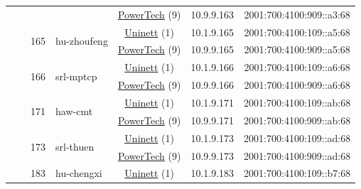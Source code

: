 \begin{small}
\begin{center}
\begin{longtable}{|c|c|c|c|c|c|c|c|}
  &  &  &  & \multicolumn{2}{|c|}{\tiny{\href{http://www.powertech.no}{PowerTech} (9)}} & \tiny{10.9.9.163} & \tiny{2001:700:4100:909::a3:68} \\* \cline{3-3}\cline{4-4}\cline{5-5}\cline{6-6}\cline{7-7}\cline{8-8}
  &  & \multirow{2}{*}{\tiny{165}} & \multicolumn{1}{|l|}{\multirow{2}{*}{\tiny{hu-zhoufeng}}} & \multicolumn{2}{|c|}{\tiny{\href{https://www.uninett.no}{Uninett} (1)}} & \tiny{10.1.9.165} & \tiny{2001:700:4100:109::a5:68} \\* \cline{5-5}\cline{6-6}\cline{7-7}\cline{8-8}
  &  &  &  & \multicolumn{2}{|c|}{\tiny{\href{http://www.powertech.no}{PowerTech} (9)}} & \tiny{10.9.9.165} & \tiny{2001:700:4100:909::a5:68} \\* \cline{3-3}\cline{4-4}\cline{5-5}\cline{6-6}\cline{7-7}\cline{8-8}
  &  & \multirow{2}{*}{\tiny{166}} & \multicolumn{1}{|l|}{\multirow{2}{*}{\tiny{srl-mptcp}}} & \multicolumn{2}{|c|}{\tiny{\href{https://www.uninett.no}{Uninett} (1)}} & \tiny{10.1.9.166} & \tiny{2001:700:4100:109::a6:68} \\* \cline{5-5}\cline{6-6}\cline{7-7}\cline{8-8}
  &  &  &  & \multicolumn{2}{|c|}{\tiny{\href{http://www.powertech.no}{PowerTech} (9)}} & \tiny{10.9.9.166} & \tiny{2001:700:4100:909::a6:68} \\* \cline{3-3}\cline{4-4}\cline{5-5}\cline{6-6}\cline{7-7}\cline{8-8}
  &  & \multirow{2}{*}{\tiny{171}} & \multicolumn{1}{|l|}{\multirow{2}{*}{\tiny{haw-cmt}}} & \multicolumn{2}{|c|}{\tiny{\href{https://www.uninett.no}{Uninett} (1)}} & \tiny{10.1.9.171} & \tiny{2001:700:4100:109::ab:68} \\* \cline{5-5}\cline{6-6}\cline{7-7}\cline{8-8}
  &  &  &  & \multicolumn{2}{|c|}{\tiny{\href{http://www.powertech.no}{PowerTech} (9)}} & \tiny{10.9.9.171} & \tiny{2001:700:4100:909::ab:68} \\* \cline{3-3}\cline{4-4}\cline{5-5}\cline{6-6}\cline{7-7}\cline{8-8}
  &  & \multirow{2}{*}{\tiny{173}} & \multicolumn{1}{|l|}{\multirow{2}{*}{\tiny{srl-thuen}}} & \multicolumn{2}{|c|}{\tiny{\href{https://www.uninett.no}{Uninett} (1)}} & \tiny{10.1.9.173} & \tiny{2001:700:4100:109::ad:68} \\* \cline{5-5}\cline{6-6}\cline{7-7}\cline{8-8}
  &  &  &  & \multicolumn{2}{|c|}{\tiny{\href{http://www.powertech.no}{PowerTech} (9)}} & \tiny{10.9.9.173} & \tiny{2001:700:4100:909::ad:68} \\* \cline{3-3}\cline{4-4}\cline{5-5}\cline{6-6}\cline{7-7}\cline{8-8}
  &  & \multirow{2}{*}{\tiny{183}} & \multicolumn{1}{|l|}{\multirow{2}{*}{\tiny{hu-chengxi}}} & \multicolumn{2}{|c|}{\tiny{\href{https://www.uninett.no}{Uninett} (1)}} & \tiny{10.1.9.183} & \tiny{2001:700:4100:109::b7:68} \\* \cline{5-5}\cline{6-6}\cline{7-7}\cline{8-8}

\end{longtable}
\end{center}
\end{small}

